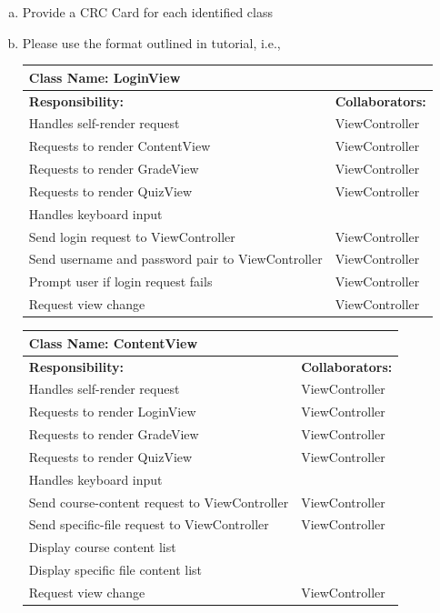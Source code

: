 \documentclass[]{article}
\begin{document}
\begin{enumerate}[a)]
	\item Provide a CRC Card for each identified class
	\item Please use the format outlined in tutorial, i.e.,

  \begin{table}[H]
		\centering
		\begin{tabular}{|p{9cm}|p{3cm}|}
		\hline
		 \multicolumn{2}{|l|}{\textbf{Class Name:} LoginView} \\
		\hline
		\textbf{Responsibility:} & \textbf{Collaborators:} \\
		\hline
    Handles self-render request & ViewController \\
    \hline
    Requests to render ContentView & ViewController \\
    \hline
    Requests to render GradeView & ViewController \\
    \hline
    Requests to render QuizView & ViewController \\
    \hline
    Handles keyboard input & \\
    \hline
    Send login request to ViewController & ViewController \\
    \hline
    Send username and password pair to ViewController & ViewController \\
    \hline
    Prompt user if login request fails & ViewController \\
    \hline
    Request view change & ViewController \\
    \hline
		\end{tabular}
	\end{table}

  \begin{table}[H]
		\centering
		\begin{tabular}{|p{9cm}|p{3cm}|}
		\hline
		 \multicolumn{2}{|l|}{\textbf{Class Name:} ContentView} \\
		\hline
		\textbf{Responsibility:} & \textbf{Collaborators:} \\
		\hline
    Handles self-render request & ViewController \\
    \hline
    Requests to render LoginView & ViewController \\
    \hline
    Requests to render GradeView & ViewController \\
    \hline
    Requests to render QuizView & ViewController \\
    \hline
    Handles keyboard input & \\
    \hline
    Send course-content request to ViewController & ViewController \\
    \hline
    Send specific-file request to ViewController & ViewController \\
    \hline
    Display course content list & \\
    \hline
    Display specific file content list & \\
    \hline
    Request view change & ViewController \\
    \hline
		\end{tabular}
	\end{table}


\end{enumerate}
\end{document}
